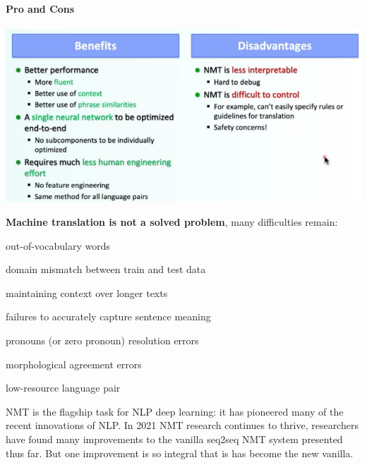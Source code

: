 \documentclass[10pt]{report}
\begin{document}
\paragraph{Pro and Cons}
\begin{center}
	\includegraphics[scale=0.75]{66.png}
\end{center}
\textbf{Machine translation is not a solved problem}, many difficulties remain:
\begin{list}{}{}
	\item out-of-vocabulary words
	\item domain mismatch between train and test data
	\item maintaining context over longer texts
	\item failures to accurately capture sentence meaning
	\item pronouns (or zero pronoun) resolution errors
	\item morphological agreement errors
	\item low-resource language pair
\end{list}
NMT is the flagship task for NLP deep learning: it has pioneered many of the recent innovations of NLP. In 2021 NMT research continues to thrive, researchers have found many improvements to the vanilla seq2seq NMT system presented thus far. But one improvement is so integral that is has become the new vanilla.
\end{document}
